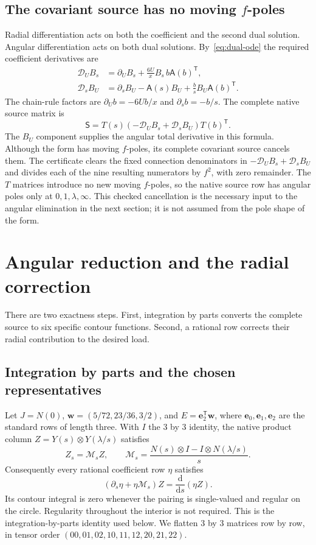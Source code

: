 \documentclass[11pt,a4paper]{article}
\newcommand{\dd}{\mathrm d}
\newcommand{\tr}{\mathsf T}
\newcommand{\e}{\mathbf e}
\newcommand{\ww}{\mathbf w}
\begin{document}
\subsection{The covariant source has no moving \texorpdfstring{$f$}{f}-poles}
Radial differentiation acts on both the coefficient and the second
dual solution. Angular differentiation acts on both dual solutions.
By~\eqref{eq:dual-ode} the required coefficient derivatives are
\begin{align*}
 \mathcal D_U B_s&=\partial_U B_s+\frac{6U}{x}B_s\,b\mathsf A(b)^{\tr},\\
 \mathcal D_s B_U&=\partial_s B_U-\mathsf A(s)B_U
                      +\frac bs B_U\mathsf A(b)^{\tr}.
\end{align*}
The chain-rule factors are $\partial_Ub=-6Ub/x$ and
$\partial_sb=-b/s$. The complete native source matrix is
\begin{equation}\label{eq:complete-source}
 \mathsf S=T(s)(-\mathcal D_U B_s+\mathcal D_s B_U)T(b)^{\tr}.
\end{equation}
The $B_U$ component supplies the angular total derivative in this
formula. Although the form has moving $f$-poles, its complete covariant
source cancels them. The certificate clears the fixed connection
denominators in $-\mathcal D_U B_s+\mathcal D_s B_U$ and divides each
of the nine resulting numerators by $f^2$, with zero remainder.
The $T$ matrices introduce no new moving $f$-poles, so the native source
row has angular poles only at $0,1,\lambda,\infty$. This checked cancellation
is the necessary input to the angular elimination in the next section;
it is not assumed from the pole shape of the form.

\section{Angular reduction and the radial correction}
\label{sec:reductions}
There are two exactness steps. First, integration by parts converts
the complete source to six specific contour functions. Second, a
rational row corrects their radial contribution to the desired load.

\subsection{Integration by parts and the chosen representatives}
Let $J=N(0)$, $\ww=(5/72,23/36,3/2)$, and $E=\e_2^{\tr}\ww$,
where $\e_0,\e_1,\e_2$ are the standard rows of length three.
With $I$ the $3$ by $3$ identity, the native product column
$Z=Y(s)\otimes Y(\lambda/s)$ satisfies
\[
 Z_s=\mathcal M_s Z,\qquad
 \mathcal M_s=\frac{N(s)\otimes I-I\otimes N(\lambda/s)}s.
\]
Consequently every rational coefficient row $\eta$ satisfies
\begin{equation}\label{eq:angular-ibp}
 (\partial_s\eta+\eta\mathcal M_s)Z
       =\frac{\dd}{\dd s}(\eta Z).
\end{equation}
Its contour integral is zero whenever the pairing is single-valued and
regular on the circle. Regularity throughout the interior is not
required. This is the integration-by-parts identity used below.
We flatten $3$ by $3$ matrices row by row, in tensor order
$(00,01,02,10,11,12,20,21,22)$.
\end{document}
